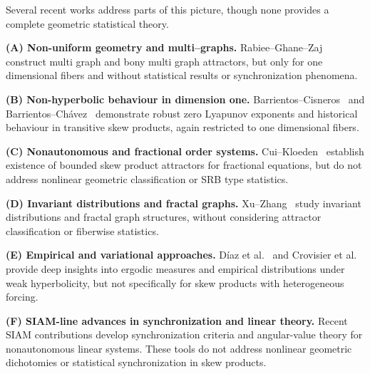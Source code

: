 \documentclass[11pt,reqno]{amsart}
\theoremstyle{plain}
\newtheorem*{theorem A}{Theorem A}
\newtheorem*{theorem B}{Theorem B}
\newtheorem*{theorem C}{Theorem C}
\newtheorem*{theorem 1}{Theorem 1}
\newtheorem*{theorem 2}{Theorem 2}
\newtheorem*{theorem 3}{Theorem 3}
\numberwithin{equation}{section}
\begin{document}

Several recent works address parts of this picture, though none provides a complete
geometric statistical theory.

\medskip
\noindent\textbf{(A) Non-uniform geometry and multi--graphs.}
Rabiee--Ghane--Zaj~\cite{rabiee2022open} construct multi graph and bony multi graph attractors,
but only for one dimensional fibers and without statistical results or synchronization
phenomena.

\noindent\textbf{(B) Non-hyperbolic behaviour in dimension one.}
Barrientos--Cisneros~\cite{barrientos2024zero} and
Barrientos--Chávez~\cite{barrientos2024historical} demonstrate robust zero Lyapunov exponents
and historical behaviour in transitive skew products, again restricted to one dimensional
fibers.

\noindent\textbf{(C) Nonautonomous and fractional order systems.}
Cui--Kloeden~\cite{cui2024skew} establish existence of bounded skew product attractors for
fractional equations, but do not address nonlinear geometric classification or SRB type
statistics.

\noindent\textbf{(D) Invariant distributions and fractal graphs.}
Xu--Zhang~\cite{xu2024invariant} study invariant distributions and fractal graph structures,
without considering attractor classification or fiberwise statistics.

\noindent\textbf{(E) Empirical and variational approaches.}
Díaz et al.~\cite{diaz2022variational} and Crovisier et al.~\cite{crovisier2020empirical} provide
deep insights into ergodic measures and empirical distributions under weak hyperbolicity, but
not specifically for skew products with heterogeneous forcing.

\noindent\textbf{(F) SIAM-line advances in synchronization and linear theory.}
Recent SIAM contributions
\cite{jardon2024persistent,beyn2023angular,beyn2022angular}
develop synchronization criteria and angular-value theory for nonautonomous linear systems.
These tools do not address nonlinear geometric dichotomies or statistical synchronization in
skew products.

\end{document}

